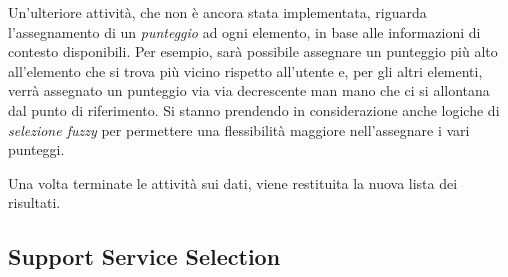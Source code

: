 Un'ulteriore attività, che non è ancora stata implementata, riguarda l'assegnamento di un \emph{punteggio} ad ogni elemento, in base alle informazioni di contesto disponibili. Per esempio, sarà possibile assegnare un punteggio più alto all'elemento che si trova più vicino rispetto all'utente e, per gli altri elementi, verrà assegnato un punteggio via via decrescente man mano che ci si allontana dal punto di riferimento. Si stanno prendendo in considerazione anche logiche di \emph{selezione fuzzy} per permettere una flessibilità maggiore nell'assegnare i vari punteggi.

Una volta terminate le attività sui dati, viene restituita la nuova lista dei risultati.

\subsection{Support Service Selection\label{sec:support-service-selection}}

